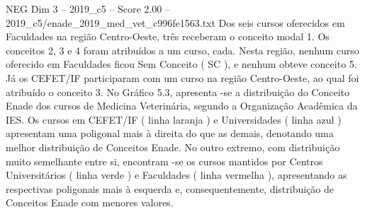 \begin{textsample}{NEG Dim 3 – 2019\_c5 – Score 2.00 – 2019\_c5/enade\_2019\_med\_vet\_c996fe1563.txt}
Dos seis cursos oferecidos em Faculdades na região Centro-Oeste, três receberam o conceito modal 1.
Os conceitos 2, 3 e 4 foram atribuídos a um curso, cada.
Nesta região, nenhum curso oferecido em Faculdades ficou Sem Conceito ( SC ), e nenhum obteve conceito 5.
Já os CEFET/IF participaram com um curso na região Centro-Oeste, ao qual foi atribuído o conceito 3.
No Gráfico 5.3, apresenta -se a distribuição do Conceito Enade dos cursos de Medicina Veterinária, segundo a Organização Acadêmica da IES.
Os cursos em CEFET/IF ( linha laranja ) e Universidades ( linha azul ) apresentam uma poligonal mais à direita do que as demais, denotando uma melhor distribuição de Conceitos Enade.
No outro extremo, com distribuição muito semelhante entre si, encontram -se os cursos mantidos por Centros Universitários ( linha verde ) e Faculdades ( linha vermelha ), apresentando as respectivas poligonais mais à esquerda e, consequentemente, distribuição de Conceitos Enade com menores valores.

\end{textsample}
